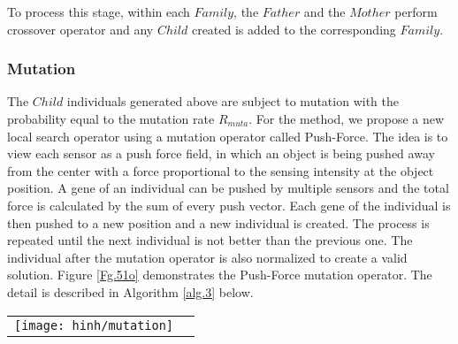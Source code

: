\documentclass[final]{elsarticle}
\begin{document}
To process this stage, within each $ Family $, the $ Father $ and the $ Mother $ perform crossover operator and any $ Child $ created is added to the corresponding $ Family $.

\subsubsection{Mutation}

The $Child$ individuals generated above are subject to mutation with the probability equal to the mutation rate $R_{muta}$. For the method, we propose a new local search operator using a mutation operator called Push-Force. The idea is to view each sensor as a push force field, in which an object is being pushed away from the center with a force proportional to the sensing intensity at the object position. A gene of an individual can be pushed by multiple sensors and the total force is calculated by the sum of every push vector. Each gene of the individual is then pushed to a new position and a new individual is created. The process is repeated until the next individual is not better than the previous one. The individual after the mutation operator is also normalized to create a valid solution. Figure \ref{Fg.51o} demonstrates the Push-Force mutation operator. The detail is described in Algorithm \ref{alg.3} below.

\begin{figure*}[h]
	\begin{tabular}{cc}
		\texttt{[image: hinh/mutation]}\\
	\end{tabular}
	\centering
	\caption{Illustration of Push-Force mutation operator}
	\label{Fg.51o}       %
\end{figure*}

\begin{algorithm}[H]
	\SetAlgoLined
	\caption{\textbf{Push-Force Mutation Operator}} 
	\label{alg.3}
\end{algorithm} 
\end{document}
